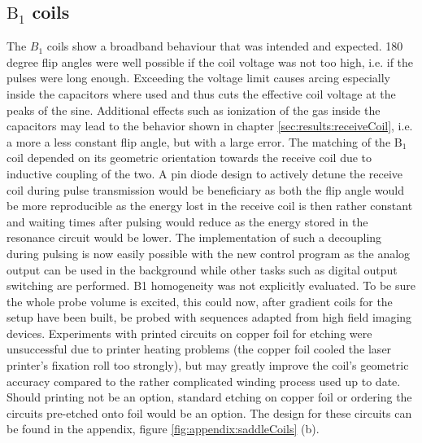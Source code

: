         \subsection{$\mathrm{B}_1$ coils}
        The $B_1$ coils show a broadband behaviour that was intended and expected. 180 degree flip angles were well possible if the coil voltage was not too high, i.e. if the pulses were long enough. Exceeding the voltage limit causes arcing especially inside the capacitors where used and thus cuts the effective coil voltage at the peaks of the sine. Additional effects such as ionization of the gas inside the capacitors may lead to the behavior shown in chapter \ref{sec:results:receiveCoil}, i.e. a more a less constant flip angle, but with a large error.
            The matching of the $\mathrm{B_1}$ coil depended on its geometric orientation towards the receive coil due to inductive coupling of the two. A pin diode design to actively detune the receive coil during pulse transmission would be beneficiary as both the flip angle would be more reproducible as the energy lost in the receive coil is then rather constant and waiting times after pulsing would reduce as the energy stored in the resonance circuit would be lower. The implementation of such a decoupling during pulsing is now easily possible with the new control program as the analog output can be used in the background while other tasks such as digital output switching are performed.
            B1 homogeneity was not explicitly evaluated. To be sure the whole probe volume is excited, this could now, after gradient coils for the setup have been built, be probed with sequences adapted from high field imaging devices.
            Experiments with printed circuits on copper foil for etching were unsuccessful due to printer heating problems (the copper foil cooled the laser printer's fixation roll too strongly), but may greatly improve the coil's geometric accuracy compared to the rather complicated winding process used up to date. Should printing not be an option, standard etching on copper foil or ordering the circuits pre-etched onto foil would be an option.  The design for these circuits can be found in the appendix, figure \ref{fig:appendix:saddleCoils} (b).
